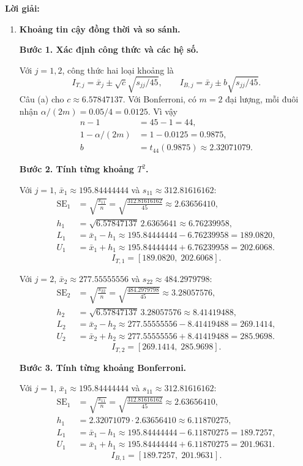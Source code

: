 \documentclass[11pt,a4paper]{article}
\newenvironment{solution}{%
  \par\medskip\noindent\textbf{Lời giải:}\par\nobreak\smallskip\noindent\ignorespaces
}{\par}
\newcommand{\answer}[1]{\boxed{#1}}
\newcommand{\step}[2]{\par\medskip\noindent\textbf{Bước #1. #2}\par\nopagebreak[4]\smallskip\noindent}
\begin{document}
\begin{solution}
\begin{enumerate}[label=\textbf{\alph*)}]
\item \textbf{Khoảng tin cậy đồng thời và so sánh.}\par\nopagebreak[4]
\step{1}{Xác định công thức và các hệ số.}
Với $j=1,2$, công thức hai loại khoảng là
\[
I_{T,j}=\bar{x}_j\pm\sqrt{c}\sqrt{s_{jj}/45},\qquad
I_{B,j}=\bar{x}_j\pm b\sqrt{s_{jj}/45}.
\]
Câu (a) cho $c\approx6.57847137$. Với Bonferroni, có $m=2$ đại lượng,
mỗi đuôi nhận $\alpha/(2m)=0.05/4=0.0125$. Vì vậy
\begin{align*}
n-1&=45-1=44,\\
1-\alpha/(2m)&=1-0.0125=0.9875,\\
b&=t_{44}(0.9875)\approx2.32071079.
\end{align*}
\step{2}{Tính từng khoảng $T^2$.}
\begin{samepage}
Với $j=1$, $\bar{x}_1\approx195.84444444$ và $s_{11}\approx312.81616162$:
\begin{align*}
\operatorname{SE}_{1}&=\sqrt{\frac{s_{11}}{n}}
=\sqrt{\frac{312.81616162}{45}}\approx2.63656410,\\
h_{1}&=\sqrt{6.57847137}\,2.6365641\approx6.76239958,\\
L_{1}&=\bar{x}_{1}-h_{1}
\approx 195.84444444-6.76239958=189.0820,\\
U_{1}&=\bar{x}_{1}+h_{1}
\approx 195.84444444+6.76239958=202.6068.
\end{align*}
\[
\answer{I_{T,1}=[189.0820,\;202.6068]}.
\]
\end{samepage}

\begin{samepage}
Với $j=2$, $\bar{x}_2\approx277.55555556$ và $s_{22}\approx484.2979798$:
\begin{align*}
\operatorname{SE}_{2}&=\sqrt{\frac{s_{22}}{n}}
=\sqrt{\frac{484.2979798}{45}}\approx3.28057576,\\
h_{2}&=\sqrt{6.57847137}\,3.28057576\approx8.41419488,\\
L_{2}&=\bar{x}_{2}-h_{2}
\approx 277.55555556-8.41419488=269.1414,\\
U_{2}&=\bar{x}_{2}+h_{2}
\approx 277.55555556+8.41419488=285.9698.
\end{align*}
\[
\answer{I_{T,2}=[269.1414,\;285.9698]}.
\]
\end{samepage}

\step{3}{Tính từng khoảng Bonferroni.}
\begin{samepage}
Với $j=1$, $\bar{x}_1\approx195.84444444$ và $s_{11}\approx312.81616162$:
\begin{align*}
\operatorname{SE}_{1}&=\sqrt{\frac{s_{11}}{n}}
=\sqrt{\frac{312.81616162}{45}}\approx2.63656410,\\
h_{1}&=2.32071079\cdot2.63656410\approx6.11870275,\\
L_{1}&=\bar{x}_{1}-h_{1}
\approx 195.84444444-6.11870275=189.7257,\\
U_{1}&=\bar{x}_{1}+h_{1}
\approx 195.84444444+6.11870275=201.9631.
\end{align*}
\[
\answer{I_{B,1}=[189.7257,\;201.9631]}.
\]
\end{samepage}


\end{enumerate}
\end{solution}
\end{document}

